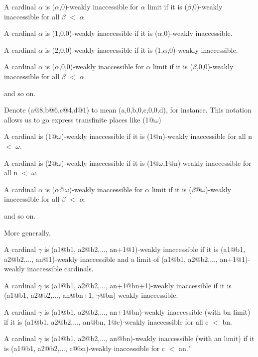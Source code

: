 \documentclass[10pt]{article}
\begin{document}
A cardinal \(\alpha\) is (\(\alpha\),0)-weakly inaccessible for \(\alpha\) limit if it is (\(\beta\),0)-weakly inaccessible for all \(\beta\) \(<\) \(\alpha\).

\bigskip

A cardinal \(\alpha\) is (1,0,0)-weakly inaccessible if it is (\(\alpha\),0)-weakly inaccessible.

A cardinal \(\alpha\) is (2,0,0)-weakly inaccessible if it is (1,\(\alpha\),0)-weakly inaccessible.

A cardinal \(\alpha\) is (\(\alpha\),0,0)-weakly inaccessible for \(\alpha\) limit if it is (\(\beta\),0,0)-weakly inaccessible for all \(\beta\) \(<\) \(\alpha\).

and so on.

\bigskip

Denote (a@8,b@6,c@4,d@1) to mean (a,0,b,0,c,0,0,d), for instance. This notation allows us to go express transfinite places like (1@\(\omega\))

\bigskip

A cardinal is (1@\(\omega\))-weakly inaccessible if it is (1@n)-weakly inaccessible for all n \(<\) \(\omega\).

A cardinal is (2@\(\omega\))-weakly inaccessible if it is (1@\(\omega\),1@n)-weakly inaccessible for all n \(<\) \(\omega\).

A cardinal \(\alpha\) is (\(\alpha\)@\(\omega\))-weakly inaccessible for \(\alpha\) limit if it is (\(\beta\)@\(\omega\))-weakly inaccessible for all \(\beta\) \(<\) \(\alpha\).

\bigskip

and so on.

\bigskip

More generally, 

\bigskip

A cardinal \(\gamma\) is (a1@b1, a2@b2,..., an+1@1)-weakly inaccessible if it is (a1@b1, a2@b2,..., an@1)-weakly inaccessible and a limit of (a1@b1, a2@b2,..., an+1@1)-weakly inaccessible cardinals.

A cardinal \(\gamma\) is (a1@b1, a2@b2,..., an+1@bn+1)-weakly inaccessible if it is (a1@b1, a2@b2,..., an@bn+1, \(\gamma\)@bn)-weakly inaccessible.

A cardinal \(\gamma\) is (a1@b1, a2@b2,..., an+1@bn)-weakly inaccessible (with bn limit) if it is (a1@b1, a2@b2,..., an@bn, 1@c)-weakly inaccessible for all c \(<\) bn.

A cardinal \(\gamma\) is (a1@b1, a2@b2,..., an@bn)-weakly inaccessible (with an limit) if it is (a1@b1, a2@b2,..., c@bn)-weakly inaccessible for c \(<\) an."
\end{document}
